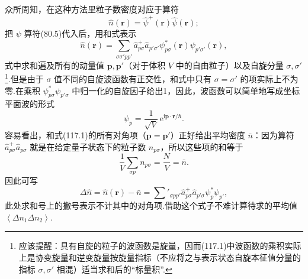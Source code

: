 众所周知，在这种方法里粒子数密度对应于算符
\begin{equation*}
  \hat{n}(\boldsymbol{r})=\hat{\psi}^{+}(\boldsymbol{r})\hat{\psi}(\boldsymbol{r});
\end{equation*}
把 $\psi$ 算符(80.5)代入后，用和式表示
\begin{equation}
  \hat{n}(\boldsymbol{r})=\sum_{\sigma\sigma'pp'}
  \hat{a}^{+}_{p\sigma}\hat{a}_{p'\sigma'}
  \psi^{*}_{p\sigma}(\boldsymbol{r})\psi_{p'\sigma'}(\boldsymbol{r}),
\end{equation}
式中求和遍及所有的动量值 $\boldsymbol{p},\boldsymbol{p}'$（对于体积 $V$ 中的自由粒子）以及自旋分量 $\sigma,\sigma'$\footnote{应该提醒：具有自旋的粒子的波函数是旋量，因而(117.1)中波函数的乘积实际上是协变旋量和逆变旋量按旋量指标（不应将之与表示状态自旋本征值分量的指标 $\sigma,\sigma'$ 相混）适当求和后的“标量积”.}.但是由于 $\sigma$ 值不同的自旋波函数有正交性，和式中只有
$\sigma=\sigma'$ 的项实际上不为零.在乘积 $\psi^{*}_{p\sigma}\psi_{p'\sigma}$
中归一化的自旋因子给出1，因此，波函数可以简单地写成坐标平面波的形式
\begin{equation}
  \psi_{p}=\frac{1}{\sqrt{V}}\,
  \mathrm{e}^{\mathrm{i}\boldsymbol{p}\cdot\boldsymbol{r}/\hbar}.
\end{equation}
容易看出，和式(117.1)的所有对角项（$\boldsymbol{p}=\boldsymbol{p}'$）正好给出平均密度
$\bar{n}$：因为算符 $\hat{a}^{+}_{p\sigma}\hat{a}_{p\sigma}$ 就是在给定量子状态下的粒子数
$n_{p\sigma}$，所以这些项的和等于
\begin{equation*}
  \frac{1}{V}\sum_{\sigma p}n_{p\sigma}=\frac{N}{V}=\bar{n}.
\end{equation*}
因此可写
\begin{equation}
  \Delta\hat{n}=\hat{n}(\boldsymbol{r})-\bar{n}
  =\sum'_{\sigma pp'}\hat{a}^{+}_{p\sigma}\hat{a}_{p'\sigma}
  \psi^{*}_{p}\psi_{p'},
\end{equation}
此处求和号上的撇号表示不计其中的对角项.借助这个式子不难计算待求的平均值
$\left\langle\Delta n_{1}\Delta n_{2}\right\rangle$.

